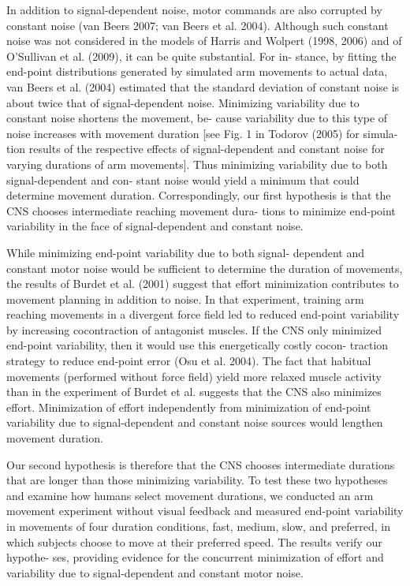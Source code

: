 In addition to signal-dependent noise, motor commands are also corrupted by constant noise (van Beers 2007; van Beers et al. 2004). Although such constant noise was not considered in the models of Harris and Wolpert (1998, 2006) and of O’Sullivan et al. (2009), it can be quite substantial. For in- stance, by fitting the end-point distributions generated by simulated arm movements to actual data, van Beers et al. (2004) estimated that the standard deviation of constant noise is about twice that of signal-dependent noise. Minimizing variability due to constant noise shortens the movement, be- cause variability due to this type of noise increases with movement duration [see Fig. 1 in Todorov (2005) for simula- tion results of the respective effects of signal-dependent and constant noise for varying durations of arm movements]. Thus minimizing variability due to both signal-dependent and con- stant noise would yield a minimum that could determine movement duration. Correspondingly, our first hypothesis is that the CNS chooses intermediate reaching movement dura- tions to minimize end-point variability in the face of signal-dependent and constant noise.

While minimizing end-point variability due to both signal- dependent and constant motor noise would be sufficient to determine the duration of movements, the results of Burdet et al. (2001) suggest that effort minimization contributes to movement planning in addition to noise. In that experiment, training arm reaching movements in a divergent force field led to reduced end-point variability by increasing cocontraction of antagonist muscles. If the CNS only minimized end-point variability, then it would use this energetically costly cocon- traction strategy to reduce end-point error (Osu et al. 2004). The fact that habitual movements (performed without force field) yield more relaxed muscle activity than in the experiment of Burdet et al. suggests that the CNS also minimizes effort. Minimization of effort independently from minimization of end-point variability due to signal-dependent and constant noise sources would lengthen movement duration.

Our second hypothesis is therefore that the CNS chooses intermediate durations that are longer than those minimizing variability. To test these two hypotheses and examine how humans select movement durations, we conducted an arm movement experiment without visual feedback and measured end-point variability in movements of four duration conditions, fast, medium, slow, and preferred, in which subjects choose to move at their preferred speed. The results verify our hypothe- ses, providing evidence for the concurrent minimization of effort and variability due to signal-dependent and constant motor noise.

